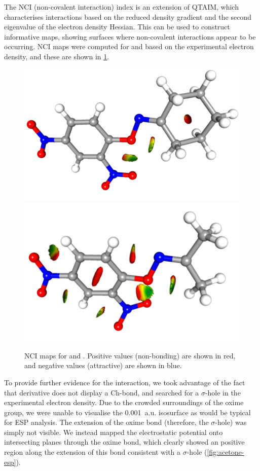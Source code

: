 \begin{refsection}
The NCI (non-covalent interaction) index is an extension of QTAIM, which characterises interactions based on the reduced density gradient and the second eigenvalue of the electron density Hessian.\autocite{Johnson2010a}
This can be used to construct informative maps, showing surfaces where non-covalent interactions appear to be occurring.
NCI maps were computed for  and  based on the experimental electron density, and these are shown in \cref{fig:NCI}.

\begin{figure}
	\centering
	\includegraphics[angle=90,width=0.35\columnwidth]{Figures/cyclohexanone-oxime-dnp-nci.pdf}
	\includegraphics[angle=90,width=0.35\columnwidth]{Figures/acetone-oxime-dnp-nci.pdf}
	\caption{NCI maps for  and . Positive values (non-bonding) are shown in red, and negative values (attractive) are shown in blue.}
	\label{fig:NCI}
\end{figure}

To provide further evidence for the interaction, we took advantage of the fact that derivative  does not display a Ch-bond, and searched for a $\sigma$-hole in the experimental electron density.
Due to the crowded surroundings of the oxime group, we were unable to visualise the 0.001~a.u. isosurface as would be typical for ESP analysis.
The extension of the oxime bond (therefore, the $\sigma$-hole) was simply not visible.
We instead mapped the electrostatic potential onto intersecting planes through the oxime bond, which clearly showed an positive region along the extension of this bond consistent with a $\sigma$-hole (\cref{fig:acetone-esp}).


\end{refsection}
